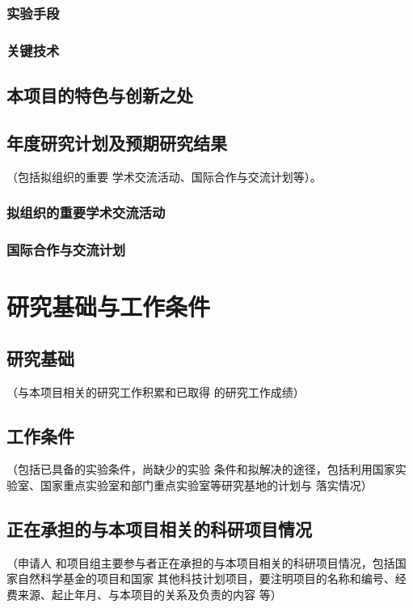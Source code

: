 \documentclass[a4paper,12pt, AutoFakeBold, fontset=adobe]{ctexart}
\begin{document}
\subsubsection{实验手段}

\subsubsection{关键技术}

\subsection{本项目的特色与创新之处}


\subsection{年度研究计划及预期研究结果}{\color{nsfcblue}\kaishu\noindent（包括拟组织的重要
  学术交流活动、国际合作与交流计划等）。}


\subsubsection{拟组织的重要学术交流活动}

\subsubsection{国际合作与交流计划}

\section{研究基础与工作条件}

\subsection{研究基础}{\color{nsfcblue}\kaishu\noindent（与本项目相关的研究工作积累和已取得
  的研究工作成绩）}

\subsection{工作条件}{\color{nsfcblue}\kaishu\noindent（包括已具备的实验条件，尚缺少的实验
  条件和拟解决的途径，包括利用国家实验室、国家重点实验室和部门重点实验室等研究基地的计划与
  落实情况）}

\subsection{正在承担的与本项目相关的科研项目情况}{\color{nsfcblue}\kaishu\noindent（申请人
  和项目组主要参与者正在承担的与本项目相关的科研项目情况，包括国家自然科学基金的项目和国家
  其他科技计划项目，要注明项目的名称和编号、经费来源、起止年月、与本项目的关系及负责的内容
  等）}
\end{document}
